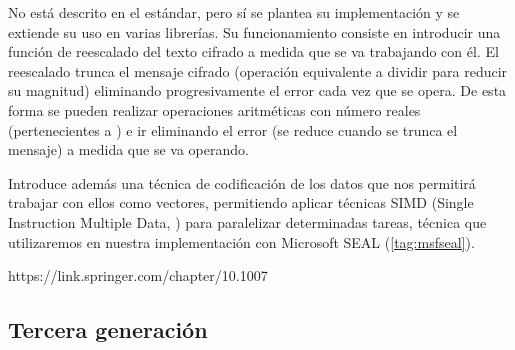 \begin{itemize}
    No está descrito en el estándar, pero sí se plantea su implementación y se extiende su uso en varias librerías. Su funcionamiento consiste en introducir una función de reescalado del texto cifrado a medida que se va trabajando con él. El reescalado trunca el mensaje cifrado (operación equivalente a dividir para reducir su magnitud) eliminando progresivamente el error cada vez que se opera. De esta forma se pueden realizar operaciones aritméticas con número reales (pertenecientes a ) e ir eliminando el error (se reduce cuando se trunca el mensaje) a medida que se va operando.

    Introduce además una técnica de codificación de los datos que nos permitirá trabajar con ellos como vectores, permitiendo aplicar técnicas SIMD (Single Instruction Multiple Data, \cite{wikipedia_contributors._simd_2017}) para paralelizar determinadas tareas, técnica que utilizaremos en nuestra implementación con Microsoft SEAL (\ref{tag:msfseal}).

    https://link.springer.com/chapter/10.1007%

\end{itemize}

\subsection{Tercera generación}

